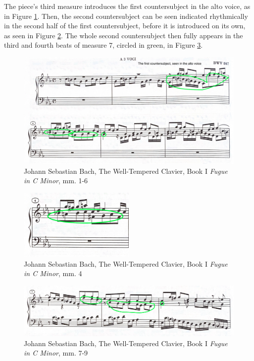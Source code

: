 The piece's third measure introduces the first countersubject in the alto voice, as in Figure \ref{fig:bach-fugue-first-countersubject}\autocite{Henle_2009}. Then, the second countersubject can be seen indicated rhythmically in the second half of the first countersubject, before it is introduced on its own, as seen in Figure \ref{fig:bach-fugue-second-cs-indication}\autocite{Henle_2009}. The whole second countersubject then fully appears in the third and fourth beats of measure 7, circled in green, in Figure \ref{fig:bach-fugue-second-countersubject}\autocite{Henle_2009}.

\begin{figure}
    \centering
    \includegraphics[width=\textwidth]{figures/bach-fugue-first-countersubject.jpg}
    \caption{Johann Sebastian Bach, The Well-Tempered Clavier, Book I \textit{Fugue in C Minor}, mm. 1-6}
    \label{fig:bach-fugue-first-countersubject}
\end{figure}

\begin{figure}[ht]
    \centering
    \includegraphics[width=0.5\textwidth]{figures/bach-fugue-second-cs-indication.jpg}
    \caption{Johann Sebastian Bach, The Well-Tempered Clavier, Book I \textit{Fugue in C Minor}, mm. 4}
    \label{fig:bach-fugue-second-cs-indication}
\end{figure}

\begin{figure}
    \centering
    \includegraphics[width=\textwidth]{figures/bach-fugue-second-countersubject.jpg}
    \caption{Johann Sebastian Bach, The Well-Tempered Clavier, Book I \textit{Fugue in C Minor}, mm. 7-9}
    \label{fig:bach-fugue-second-countersubject}
\end{figure}

